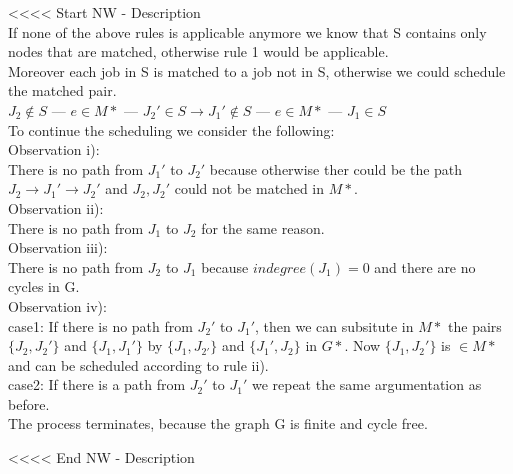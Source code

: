 <<<< Start NW - Description \\
 If none of the above rules is applicable anymore we know that S contains only nodes that are matched, otherwise rule 1 would be applicable.\\
 Moreover each job in S is matched to a job not in S, otherwise we could schedule the matched pair. \\
  $ J_{2} \not\in S$ --- $ e\in M*$ --- $J_{2}' \in S \rightarrow J_{1}' \not\in S$  --- $ e\in M*$ --- $ J_{1} \in S$ \\
 To continue the scheduling we consider the following:\\
 Observation i):\\
 There is no path from $J_{1}'$ to $J_{2}'$ because otherwise ther could be the path $J_{2} \rightarrow J_{1}' \rightarrow J_{2}'$ and $J_{2},J_{2}'$ could not be matched in $M*$.\\
 \newline
 Observation ii):\\
 There is no path from $J_{1}$ to $J_{2}$ for the same reason. \\
 \newline
 Observation iii): \\
 There is no path from $J_{2}$ to $J_{1}$ because $indegree(J_{1})=0$ and there are no cycles in G.\\
 \newline
 Observation iv): \\
 case1: If there is no path from $J_{2}'$ to $J_{1}'$, then we can subsitute in $M*$ the pairs $\{ J_{2}, J_{2}' \}$ and  $\{ J_{1}, J_{1}' \}$ by $\{ J_{1}, J_{2'} \}$ and $\{ J_{1}', J_{2} \}$ in $G*$. Now $\{ J_{1}, J_{2}' \}$ is $\in M*$ and can be scheduled according to rule ii). \\
 case2: If there is a path from $J_{2}'$ to $J_{1}'$ we repeat the same argumentation as before. \\
 \newline
 The process terminates, because the graph G is finite and cycle free.
 
<<<< End NW - Description \\



